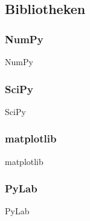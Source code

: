 \subsection{Bibliotheken}
\subsubsection{NumPy}
\begin{frame}{NumPy}
\end{frame}

\subsubsection{SciPy}
\begin{frame}{SciPy}
\end{frame}

\subsubsection{matplotlib}
\begin{frame}{matplotlib}
\end{frame}

\subsubsection{PyLab}
\begin{frame}{PyLab}
\end{frame}
